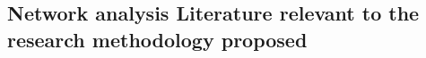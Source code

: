 \documentclass[11pt]{article} %
\begin{document}
%
%
%
%
%
%
%
%
%
%
%
%
%
%
%




\subsection{Network analysis Literature relevant to the research methodology proposed}
\end{document}
